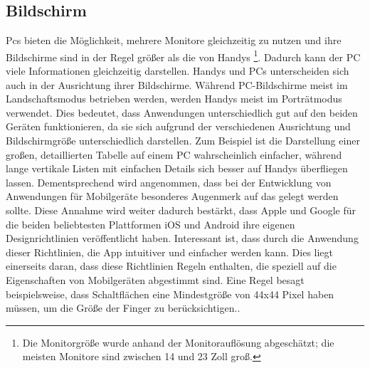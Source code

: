 \subsection{Bildschirm}
Pcs bieten die Möglichkeit, mehrere Monitore gleichzeitig zu nutzen und ihre Bildschirme sind in der Regel größer als die von Handys \cite{pcVsphone_screenResolutionStats}\cite{pcVsphone_screenResolutionToSize}\footnote{Die Monitorgröße wurde anhand der Monitorauflösung abgeschätzt; die meisten Monitore sind zwischen 14 und 23 Zoll groß.}.\newline%
	Dadurch kann der PC viele Informationen gleichzeitig darstellen.\newline%
Handys und PCs unterscheiden sich auch in der Ausrichtung ihrer Bildschirme. Während PC-Bildschirme meist im Landschaftsmodus betrieben werden, werden Handys meist im Porträtmodus verwendet.\newline%
	Dies bedeutet, dass Anwendungen unterschiedlich gut auf den beiden Geräten funktionieren, da sie sich aufgrund der verschiedenen Ausrichtung und Bildschirmgröße unterschiedlich darstellen. %
		Zum Beispiel ist die Darstellung einer großen, detaillierten Tabelle auf einem PC wahrscheinlich einfacher, während lange vertikale Listen mit einfachen Details sich besser auf Handys überfliegen lassen.\newline%
Dementsprechend wird angenommen, dass bei der Entwicklung von Anwendungen für Mobilgeräte besonderes Augenmerk auf das  gelegt werden sollte. %
	Diese Annahme wird weiter dadurch bestärkt, dass Apple und Google für die beiden beliebtesten Plattformen iOS und Android\cite{pcVsphone_mobileOperatingSystem} ihre eigenen Designrichtlinien veröffentlicht haben\cite{konventionen_guidelinesApple, konventionen_guidelinesGoogle}.\newline%
	Interessant ist, dass durch die Anwendung dieser Richtlinien, die App intuitiver und einfacher werden kann. %
		Dies liegt einerseits daran, dass diese Richtlinien Regeln enthalten, die speziell auf die Eigenschaften von Mobilgeräten abgestimmt sind. Eine Regel besagt beispielsweise, dass Schaltflächen eine Mindestgröße von 44x44 Pixel haben müssen, um die Größe der Finger zu berücksichtigen.\cite{konventionen_buttonSize}.\newline%
